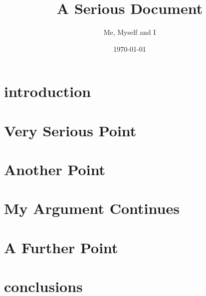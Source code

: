 \documentclass[a4paper]{article}
\title{A Serious Document}
\author{Me, Myself and I}
\date{\today}
\begin{document}
\maketitle

\tableofcontents

\begin{abstract}

\end{abstract}


\section{introduction}


\section{Very Serious Point}


\section{Another Point}


\section{My Argument Continues}


\section{A Further Point}



\section{conclusions}


\appendix
\end{document}
